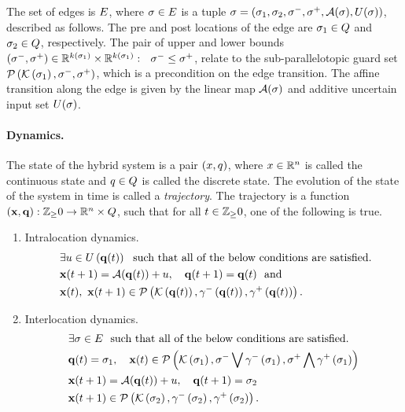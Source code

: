 The set of edges is $E$, where $\sigma\in E$ is a tuple
$\sigma =
\left(\sigma_{1},\sigma_{2},\sigma^-,\sigma^+,\mathcal{A}(\sigma),U(\sigma)\right)$,
described as follows.  The pre and post locations of the edge are
$\sigma_{1}\in Q$ and $\sigma_{2}\in Q$,
respectively.  The pair of upper and lower bounds
$\left(\sigma^-,\sigma^+\right)\in\mathbb{R}^{k\left(\sigma_{1}\right)}\times\mathbb{R}^{k\left(\sigma_{1}\right)}:~~\sigma^-\leq\sigma^+$,
relate to the sub-parallelotopic guard set
$\mathcal{P}\left(\mathcal{K}\left(\sigma_{1}\right),\sigma^-,\sigma^+\right)$, which
is a precondition on the edge transition.  The
affine transition along the edge is given by the linear map
$\mathcal{A}(\sigma)$ and additive uncertain input set $U(\sigma)$.

\paragraph{Dynamics.}
The state of the hybrid system is a pair $(x,q)$, where
$x\in\mathbb{R}^n$ is called the continuous state and
$q\in Q$ is called the discrete state.  The
evolution of the state of the system in time is called a
\emph{trajectory}.  The trajectory is a function
$\left({\bf x},{\bf q}\right):\mathbb{Z}_\geq 0\rightarrow\mathbb{R}^n\times Q$, such
that for all $t\in\mathbb{Z}_\geq 0$, one of the following is true.

\begin{enumerate}
\item Intralocation dynamics.
\begin{align}~\label{eqn:intralocation}
\begin{split}
& \exists u\in U\left({\bf q}(t)\right)~~\text{such that all of
    the below conditions  are satisfied.}\\
& {\bf x}(t+1) = \mathcal{A}({\bf q}(t))+u,~~~{\bf q}(t+1) = {\bf q}(t)~~
\text{and}\\
& {\bf x}(t),~{\bf x}(t+1)\in\mathcal{P}\left(\mathcal{K}\left({\bf q}(t)\right),\gamma^-\left({\bf q}(t)\right),\gamma^+\left({\bf q}(t)\right)\right).
\end{split}
\end{align}
\item Interlocation dynamics.
\begin{align} 
\begin{split}
& \exists \sigma\in E~~\text{such that all of the below
    conditions are satisfied.}\\
&
  {\bf q}(t)=\sigma_{1},~~~{\bf x}(t)\in\mathcal{P}\left(\mathcal{K}\left(\sigma_{1}\right),\sigma^-\bigvee\gamma^-\left(\sigma_{1}\right),\sigma^+\bigwedge\gamma^+\left(\sigma_{1}\right)\right) \\
& {\bf x}(t+1) = \mathcal{A}({\bf q}(t))+u,~~~{\bf q}(t+1) = \sigma_{2}\\
& {\bf x}(t+1)\in \mathcal{P}\left(\mathcal{K}\left(\sigma_{2}\right),\gamma^-\left(\sigma_{2}\right),\gamma^+\left(\sigma_{2}\right)\right).
\end{split}
\end{align}
\end{enumerate}

